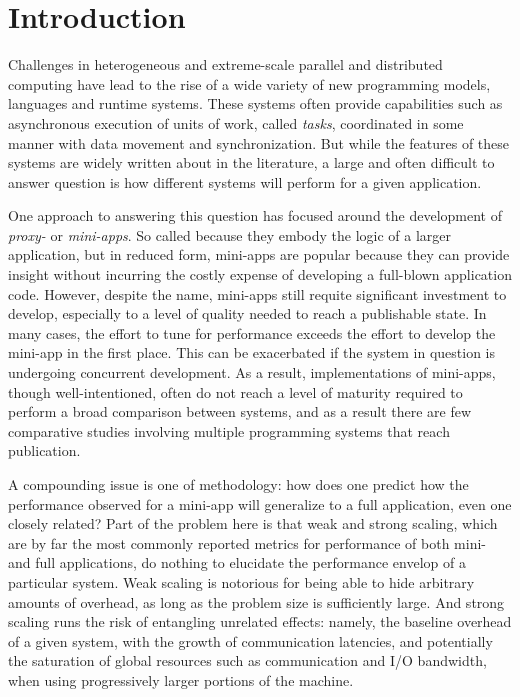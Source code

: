 \section{Introduction}
\label{sec:introduction}

Challenges in heterogeneous and extreme-scale parallel and distributed
computing have lead to the rise of a wide variety of new programming
models, languages and runtime systems. These systems often provide
capabilities such as asynchronous execution of units of work, called
\emph{tasks}, coordinated in some manner with data movement and
synchronization. But while the features of these systems are widely
written about in the literature, a large and often difficult to answer
question is how different systems will perform for a given
application.

One approach to answering this question has focused around the
development of \emph{proxy-} or \emph{mini-apps}. So called because
they embody the logic of a larger application, but in reduced form,
mini-apps are popular because they can provide insight without
incurring the costly expense of developing a full-blown application
code. However, despite the name, mini-apps still requite significant
investment to develop, especially to a level of quality needed to reach
a publishable state. In many cases, the effort to tune for performance
exceeds the effort to develop the mini-app in the first place. This
can be exacerbated if the system in question is undergoing concurrent
development. As a result, implementations of mini-apps, though
well-intentioned, often do not reach a level of maturity required to
perform a broad comparison between systems, and as a result there are
few comparative studies involving multiple programming systems
that reach publication.

A compounding issue is one of methodology: how does one predict how
the performance observed for a mini-app will generalize to a full
application, even one closely related? Part of the problem here is
that weak and strong scaling, which are by far the most commonly
reported metrics for performance of both mini- and full applications,
do nothing to elucidate the performance envelop of a particular
system. Weak scaling is notorious for being able to hide arbitrary
amounts of overhead, as long as the problem size is sufficiently
large. And strong scaling runs the risk of entangling unrelated
effects: namely, the baseline overhead of a given system, with the
growth of communication latencies, and potentially the saturation of
global resources such as communication and I/O bandwidth, when using
progressively larger portions of the machine.

